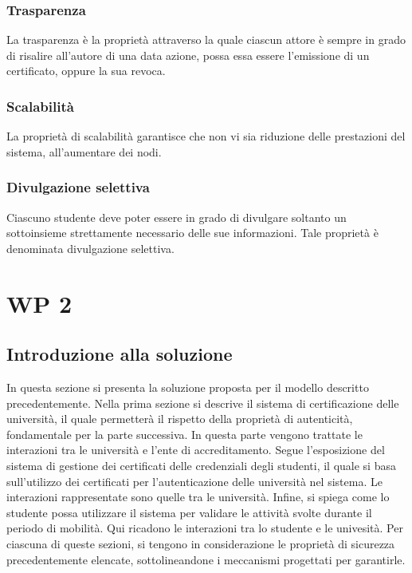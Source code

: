 \documentclass[a4paper,12pt]{article}
\begin{document}
\subsubsection{Trasparenza}
La trasparenza è la proprietà attraverso la quale ciascun attore è sempre in grado di risalire all'autore di una data azione, possa essa essere l'emissione di un certificato, oppure la sua revoca.
\subsubsection{Scalabilità}
La proprietà di scalabilità garantisce che non vi sia riduzione delle prestazioni del sistema, all'aumentare dei nodi.
\subsubsection{Divulgazione selettiva}
Ciascuno studente deve poter essere in grado di divulgare soltanto un sottoinsieme strettamente necessario delle sue informazioni. Tale proprietà è denominata divulgazione selettiva.



\newpage
\section{WP 2}
\subsection{Introduzione alla soluzione}
In questa sezione si presenta la soluzione proposta per il modello descritto precedentemente.
\newline Nella prima sezione si descrive il sistema di certificazione delle università, il quale permetterà il rispetto della proprietà di autenticità, fondamentale per la parte successiva. In questa parte vengono trattate le interazioni tra le università e l'ente di accreditamento.  
\newline Segue l'esposizione del sistema di gestione dei certificati delle credenziali degli studenti, il quale si basa sull'utilizzo dei certificati per l'autenticazione delle università nel sistema. Le interazioni rappresentate sono quelle tra le università. 
\newline Infine, si spiega come lo studente possa utilizzare il sistema per validare le attività svolte durante il periodo di mobilità. Qui ricadono le interazioni tra lo studente e le univesità. 
\newline Per ciascuna di queste sezioni, si tengono in considerazione le proprietà di sicurezza precedentemente elencate, sottolineandone i meccanismi progettati per garantirle.
\end{document}

